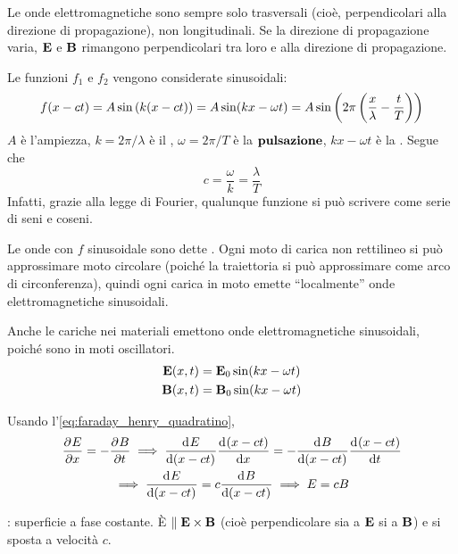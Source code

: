 Le onde elettromagnetiche sono sempre solo trasversali (cioè, perpendicolari alla direzione di propagazione), non longitudinali.
Se la direzione di propagazione varia, $\mathbf{E}$ e $\mathbf{B}$ rimangono perpendicolari tra loro e alla direzione di propagazione.

Le funzioni $f_1$ e $f_2$ vengono considerate sinusoidali:
\begin{equation}
    f(x - c t) = A \sin\left( k (x - c t) \right) = A \sin(k x - \omega t)
    = A \sin\left( 2\pi \left( \frac{x}{\lambda} - \frac{t}{T} \right) \right)
\end{equation}
$A$ è l'ampiezza, $k = 2\pi / \lambda$ è il , $\omega = 2\pi / T$ è la $\textbf{pulsazione}$, $k x - \omega t$ è la .
Segue che
\begin{equation}
    c = \frac{\omega}{k} = \frac{\lambda}{T}
\end{equation}
Infatti, grazie alla legge di Fourier, qualunque funzione si può scrivere come serie di seni e coseni.

Le onde con $f$ sinusoidale sono dette .
Ogni moto di carica non rettilineo si può approssimare moto circolare (poiché la traiettoria si può approssimare come arco di circonferenza), quindi ogni carica in moto emette ``localmente'' onde elettromagnetiche sinusoidali.

Anche le cariche nei materiali emettono onde elettromagnetiche sinusoidali, poiché sono in moti oscillatori.
\begin{subequations}
\begin{gather}
    \mathbf{E}(x, t) = \mathbf{E}_0 \sin(k x - \omega t) \\
    \mathbf{B}(x, t) = \mathbf{B}_0 \sin(k x - \omega t)
\end{gather}
\end{subequations}

Usando l'\cref{eq:faraday_henry_quadratino},
\begin{equation}
\begin{gathered}
    \parder[E]{x} = - \parder[B]{t}
    \implies
    \der[E]{(x - c t)} \der[(x - c t)]{x} = - \der[B]{(x - c t)} \der[(x - c t)]{t} \\
    \implies
    \der[E]{(x - c t)} = c \der[B]{(x - c t)}
    \implies
    E = c B
\end{gathered}
\end{equation}

: superficie a fase costante.
È $\parallel \mathbf{E} \times \mathbf{B}$ (cioè perpendicolare sia a $\mathbf{E}$ si a $\mathbf{B}$) e si sposta a velocità $c$.

